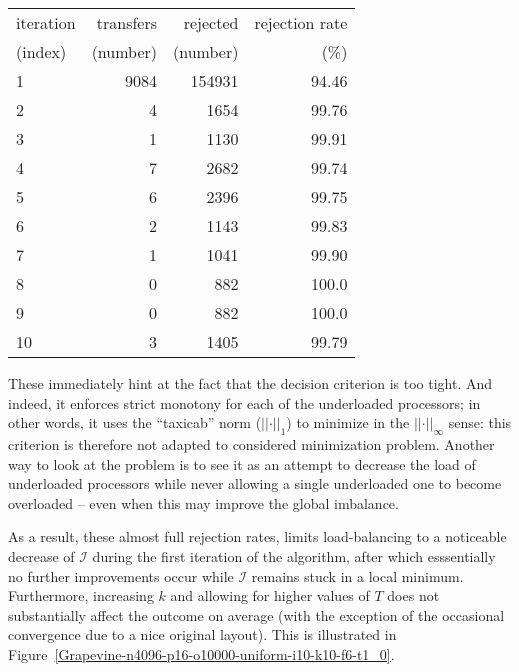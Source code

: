 \begin{center}
\begin{tabular}{lrrr}
\hline
iteration & transfers & rejected & rejection rate\\
(index)   & (number)  & (number) & (\%)\\
\hline\hline
 1 & 9084 & 154931 & 94.46\\
 2 &    4 &   1654 & 99.76\\
 3 &    1 &   1130 & 99.91\\
 4 &    7 &   2682 & 99.74\\
 5 &    6 &   2396 & 99.75\\
 6 &    2 &   1143 & 99.83\\
 7 &    1 &   1041 & 99.90\\
 8 &    0 &    882 & 100.0\\
 9 &    0 &    882 & 100.0\\
10 &    3 &   1405 & 99.79\\
\hline
\end{tabular}
\end{center}
These immediately hint at the fact that the decision criterion is too
tight. And indeed, it enforces strict monotony for each of the
underloaded processors; in other words, it uses the ``taxicab'' norm
($\vert\vert\cdot\vert\vert_1$) to minimize in the
$\vert\vert\cdot\vert\vert_\infty$ sense: this criterion is therefore
not adapted to considered minimization problem.
Another way to look at the problem is to see it as an attempt to
decrease the load of underloaded processors while never allowing a
single underloaded one to become overloaded -- even when this may
improve the global imbalance.

As a result, these almost full rejection rates, limits load-balancing
to a noticeable decrease of $\mathcal{I}$ during the
first iteration of the algorithm, after which esssentially no further
improvements occur while $\mathcal{I}$ remains stuck in a local
minimum. Furthermore, increasing $k$ and allowing for higher values of
$T$ does not substantially affect the outcome on average (with the
exception of the occasional convergence due to a nice original layout).
This is illustrated in
Figure~\ref{Grapevine-n4096-p16-o10000-uniform-i10-k10-f6-t1_0}.




